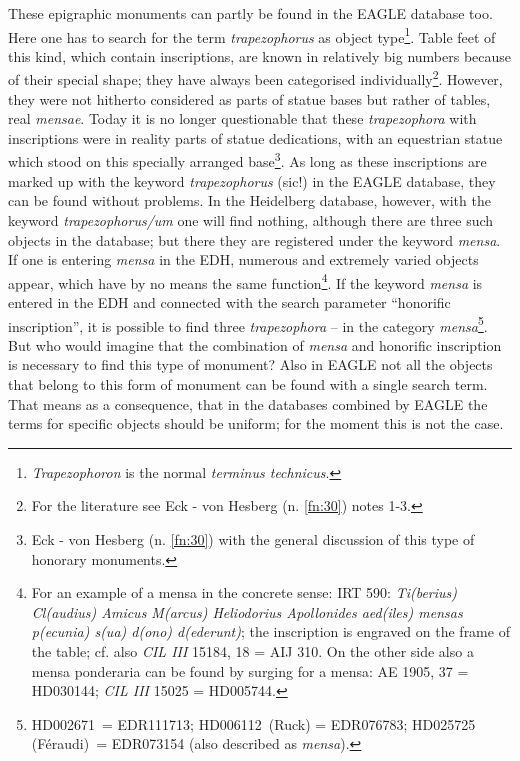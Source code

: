 \documentclass[amsthm,ebook]{saparticle}
\begin{document}
These epigraphic monuments can partly be found in the EAGLE database too. Here 
one has to search for the term \textit{trapezophorus }as object type\footnote{\emph{Trapezophoron} is the normal \emph{terminus technicus}.}. Table feet 
of this kind, which contain inscriptions, are known in relatively big numbers because 
of their special shape; they have always been categorised individually\footnote{For the literature see Eck - von Hesberg (n. \ref{fn:30}) notes 1-3.}. However, 
they were not hitherto considered as parts of statue bases but rather of tables, 
real \textit{mensae}. Today it is no longer questionable that these \textit{trapezophora 
}with inscriptions were in reality parts of statue dedications, with an equestrian 
statue which stood on this specially arranged base\footnote{Eck - von Hesberg (n. \ref{fn:30}) with the general discussion of this type of honorary monuments.}. As long as these inscriptions 
are marked up with the keyword \textit{trapezophorus }(sic!) in the EAGLE database, 
they can be found without problems. In the Heidelberg database, however, with the 
keyword \textit{trapezophorus/um} one will find nothing, although there are three 
such objects in the database; but there they are\textit{ }registered under the 
keyword \textit{mensa}. If one is entering \textit{mensa }in the EDH, numerous 
and extremely varied objects appear, which have by no means the same function\footnote{For an example of a mensa in the concrete sense: IRT 590: \emph{Ti(berius) Cl(audius) Amicus M(arcus) Heliodorius Apollonides aed(iles) mensas p(ecunia) s(ua) d(ono) d(ederunt)}; the inscription is engraved on the frame of the table; cf. also \emph{CIL III} 15184, 18 = AIJ 310. On the other side also a mensa ponderaria can be found by surging for a mensa: AE 1905, 37 = HD030144; \emph{CIL III} 15025 = HD005744.}. 
If the keyword \textit{mensa }is entered in the EDH and connected with the search 
parameter ``honorific inscription'', it is possible to find three \textit{trapezophora} 
– in the category \textit{mensa}\footnote{HD002671 = EDR111713; HD006112 (Ruck) = EDR076783; HD025725 (Féraudi) = EDR073154 (also described as \emph{mensa}).}. But who would imagine that the combination 
of \textit{mensa} and honorific inscription is necessary to find this type of monument? 
Also in EAGLE not all the objects that belong to this form of monument can be found 
with a single search term. That means as a consequence, that in the databases combined 
by EAGLE the terms for specific objects should be uniform; for the moment this 
is not the case. 
\end{document}

